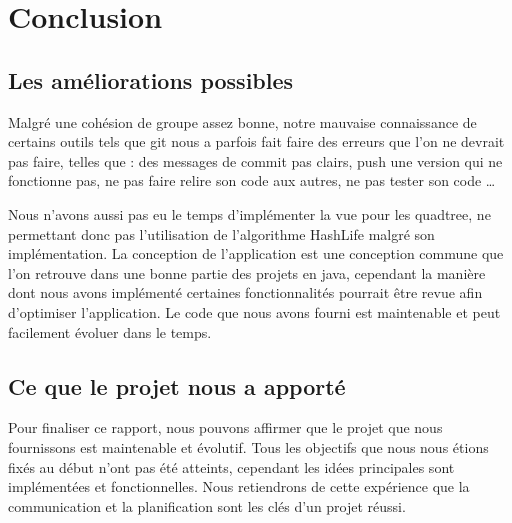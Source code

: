 \documentclass[12pt]{article}
\begin{document}
			\section{Conclusion}
			\subsection{Les améliorations possibles}
			Malgré une cohésion de groupe assez bonne, notre mauvaise connaissance de certains outils tels que git nous a parfois fait faire des erreurs que l'on ne devrait pas faire, 
			telles que : des messages de commit pas clairs, push une version qui ne fonctionne pas, ne pas faire relire son code aux autres, ne pas tester son code …
			
			Nous n'avons aussi pas eu le temps d'implémenter la vue pour les quadtree, ne permettant donc pas l'utilisation de l'algorithme HashLife malgré son implémentation. 
			La conception de l'application est une conception commune que l'on retrouve dans une bonne partie des projets en java, 
			cependant la manière dont nous avons implémenté certaines fonctionnalités pourrait être revue afin d'optimiser l'application. 
			Le code que nous avons fourni est maintenable et peut facilement évoluer dans le temps.
			
			\subsection{Ce que le projet nous a apporté}
			Pour finaliser ce rapport, nous pouvons affirmer que le projet que nous fournissons est maintenable et évolutif. Tous les objectifs que nous nous étions fixés au début n'ont pas été atteints, 
			cependant les idées principales sont implémentées et fonctionnelles. Nous retiendrons de cette expérience que la communication et la planification sont les clés d'un projet réussi.
			
\end{document}
